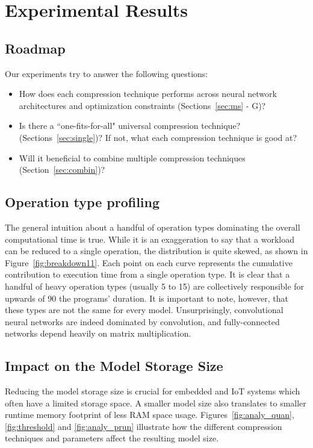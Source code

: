 \section{Experimental Results}


\subsection{Roadmap}
Our experiments try to answer the following questions:

\begin{itemize}
\item How does each compression technique performs across neural network architectures and optimization constraints
    (Sections~\ref{sec:ms} - G)?
\item Is there a ``one-fits-for-all" universal compression technique? (Sections~\ref{sec:single})? If not, what each compression
    technique is good at?
\item Will it beneficial to combine multiple compression techniques (Section~\ref{sec:combin})?
\end{itemize}

\subsection{Operation type profiling}
The general intuition about a handful of operation types dominating the overall computational time is true. While it is
an exaggeration to say that a workload can be reduced to a single operation, the distribution is quite skewed, as shown in
Figure~\ref{fig:breakdown11}. Each point on each curve represents the cumulative
contribution to execution time from a single operation type.
It is clear that a handful of heavy operation types (usually
5 to 15) are collectively responsible for upwards of 90%
the programs’ duration. It is important to note, however, that
these types are not the same for every model.
Unsurprisingly, convolutional neural networks are indeed
dominated by convolution, and fully-connected networks depend
heavily on matrix multiplication.


\subsection{Impact on the Model Storage Size\label{sec:ms}}
Reducing the model storage size is crucial for embedded and IoT systems which often have a limited storage space. A smaller model size also
translates to smaller runtime memory footprint of less RAM space usage. Figures~\ref{fig:analy_quan},\ref{fig:threshold} and \ref{fig:analy_prun} illustrate
how the different compression techniques and parameters affect the resulting model size.

